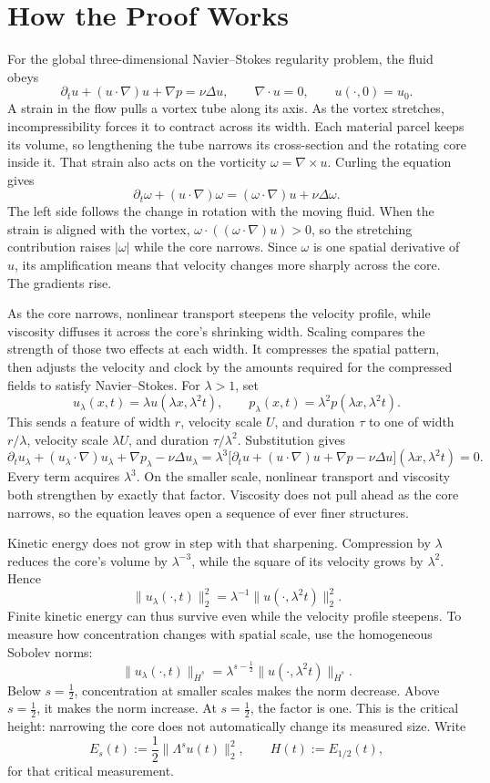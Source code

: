 \documentclass[11pt]{article}
\begin{document}
\section*{How the Proof Works}

For the global three-dimensional Navier--Stokes regularity problem, the fluid obeys
\[
\partial_tu+(u\cdot\nabla)u+\nabla p=\nu\Delta u,
\qquad \nabla\cdot u=0,
\qquad u(\cdot,0)=u_0.
\]
A strain in the flow pulls a vortex tube along its axis. As the vortex stretches, incompressibility forces it to contract across its width. Each material parcel keeps its volume, so lengthening the tube narrows its cross-section and the rotating core inside it. That strain also acts on the vorticity \(\omega=\nabla\times u\). Curling the equation gives
\[
\partial_t\omega+(u\cdot\nabla)\omega
=(\omega\cdot\nabla)u+\nu\Delta\omega.
\]
The left side follows the change in rotation with the moving fluid. When the strain is aligned with the vortex, \(\omega\cdot((\omega\cdot\nabla)u)>0\), so the stretching contribution raises \(|\omega|\) while the core narrows. Since \(\omega\) is one spatial derivative of \(u\), its amplification means that velocity changes more sharply across the core. The gradients rise.

As the core narrows, nonlinear transport steepens the velocity profile, while viscosity diffuses it across the core's shrinking width. Scaling compares the strength of those two effects at each width. It compresses the spatial pattern, then adjusts the velocity and clock by the amounts required for the compressed fields to satisfy Navier--Stokes. For \(\lambda>1\), set
\[
u_\lambda(x,t)=\lambda u(\lambda x,\lambda^2t),
\qquad
p_\lambda(x,t)=\lambda^2p(\lambda x,\lambda^2t).
\]
This sends a feature of width \(r\), velocity scale \(U\), and duration \(\tau\) to one of width \(r/\lambda\), velocity scale \(\lambda U\), and duration \(\tau/\lambda^2\). Substitution gives
\[
\partial_tu_\lambda+(u_\lambda\cdot\nabla)u_\lambda
+\nabla p_\lambda-\nu\Delta u_\lambda
=\lambda^3
\bigl[\partial_tu+(u\cdot\nabla)u+\nabla p-\nu\Delta u\bigr]
(\lambda x,\lambda^2t)=0.
\]
Every term acquires \(\lambda^3\). On the smaller scale, nonlinear transport and viscosity both strengthen by exactly that factor. Viscosity does not pull ahead as the core narrows, so the equation leaves open a sequence of ever finer structures.

Kinetic energy does not grow in step with that sharpening. Compression by \(\lambda\) reduces the core's volume by \(\lambda^{-3}\), while the square of its velocity grows by \(\lambda^2\). Hence
\[
\|u_\lambda(\cdot,t)\|_2^2
=\lambda^{-1}\|u(\cdot,\lambda^2t)\|_2^2.
\]
Finite kinetic energy can thus survive even while the velocity profile steepens. To measure how concentration changes with spatial scale, use the homogeneous Sobolev norms:
\[
\|u_\lambda(\cdot,t)\|_{\dot H^s}
=\lambda^{s-\frac12}
\|u(\cdot,\lambda^2t)\|_{\dot H^s}.
\]
Below \(s=\tfrac12\), concentration at smaller scales makes the norm decrease. Above \(s=\tfrac12\), it makes the norm increase. At \(s=\tfrac12\), the factor is one. This is the critical height: narrowing the core does not automatically change its measured size. Write
\[
E_s(t):=\frac12\|\Lambda^su(t)\|_2^2,
\qquad
H(t):=E_{1/2}(t),
\]
for that critical measurement.
\end{document}
